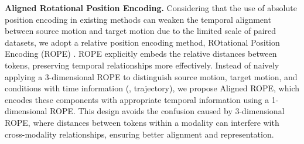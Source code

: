 \noindent\textbf{Aligned Rotational Position Encoding.} 
Considering that the use of absolute position encoding in existing methods \cite{chen2023executing} can weaken the temporal alignment between source motion and target motion due to the limited scale of paired datasets, we adopt a relative position encoding method, ROtational Position Encoding (ROPE) \cite{su2024roformer}. ROPE explicitly embeds the relative distances between tokens, preserving temporal relationships more effectively. Instead of naively applying a 3-dimensional ROPE to distinguish source motion, target motion, and conditions with time information (\eg, trajectory), we propose Aligned ROPE, which encodes these components with appropriate temporal information using a 1-dimensional ROPE. This design avoids the confusion caused by 3-dimensional ROPE, where distances between tokens within a modality can interfere with cross-modality relationships, ensuring better alignment and representation.

